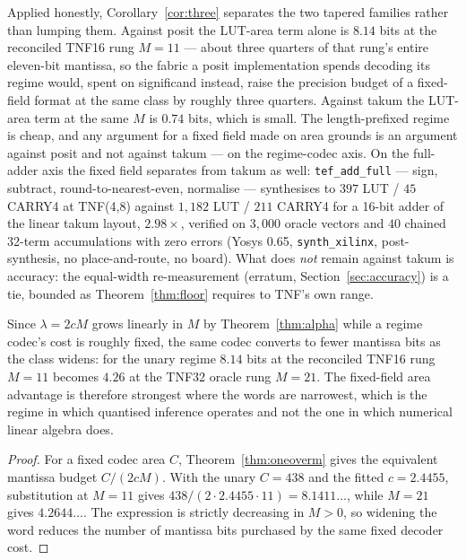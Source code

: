 Applied honestly, Corollary~\ref{cor:three} separates the two tapered families
rather than lumping them. Against posit the LUT-area term alone is $8.14$ bits at
the reconciled TNF16 rung $M = 11$ --- about three quarters of that rung's entire
eleven-bit mantissa, so the fabric a posit implementation spends decoding its
regime would, spent on significand instead, raise the precision budget of a
fixed-field format at the same class by roughly three quarters. Against takum the
LUT-area term at the same $M$ is $0.74$ bits, which is small. The
length-prefixed regime is cheap, and any argument for a fixed field made on area
grounds is an argument against posit and not against takum --- on the
regime-codec axis. On the full-adder axis the fixed field separates from takum
as well: \texttt{tef\_add\_full} --- sign, subtract, round-to-nearest-even,
normalise --- synthesises to $397$ LUT / $45$ CARRY4 at TNF(4,8) against
$1{,}182$ LUT / $211$ CARRY4 for a 16-bit adder of the linear takum layout,
$2.98\times$, verified on $3{,}000$ oracle vectors and $40$ chained 32-term
accumulations with zero errors (Yosys 0.65, \texttt{synth\_xilinx},
post-synthesis, no place-and-route, no board). What does \emph{not} remain
against takum is accuracy: the equal-width re-measurement (erratum,
Section~\ref{sec:accuracy}) is a tie, bounded as Theorem~\ref{thm:floor}
requires to TNF's own range.

\begin{corollary}
\label{cor:narrow}
Since $\lambda = 2cM$ grows linearly in $M$ by Theorem~\ref{thm:alpha} while a
regime codec's cost is roughly fixed, the same codec converts to fewer mantissa
bits as the class widens: for the unary regime $8.14$ bits at the reconciled
TNF16 rung $M = 11$ becomes $4.26$ at the TNF32 oracle rung $M = 21$. The fixed-field area
advantage is therefore strongest where the words are narrowest, which is the
regime in which quantised inference operates and not the one in which numerical
linear algebra does.
\end{corollary}
\begin{proof}
For a fixed codec area $C$, Theorem~\ref{thm:oneoverm} gives the equivalent
mantissa budget $C/(2cM)$.  With the unary $C=438$ and the fitted
$c=2.4455$, substitution at $M=11$ gives $438/(2\cdot2.4455\cdot11)
=8.1411\ldots$, while $M=21$ gives $4.2644\ldots$.  The expression is
strictly decreasing in $M>0$, so widening the word reduces the number of
mantissa bits purchased by the same fixed decoder cost.
\end{proof}



